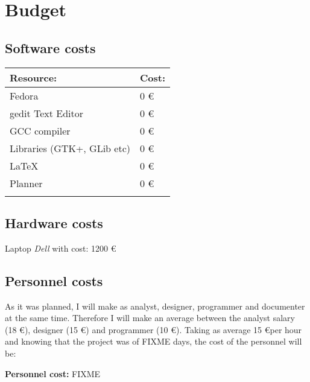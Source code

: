 
\chapter{Budget}


\section{Software costs}\label{sec:SoftwareCosts}

\begin{center}
  \begin{tabularx}{0.75\textwidth}{|X|X|}
    \firsthline
    \textbf{Resource:} & \textbf{Cost:} \\
    \hline
    Fedora & 0 \euro \\
    \hline
    gedit Text Editor & 0 \euro \\
    \hline
    GCC compiler & 0 \euro \\
    \hline
    Libraries (GTK+, GLib etc) & 0 \euro \\
    \hline
    \LaTeX & 0 \euro \\
    \hline
    Planner & 0 \euro \\
    \lasthline
  \end{tabularx}
\end{center}

\section{Hardware costs}\label{sec:HardwareCosts}

Laptop \emph{Dell} with cost: 1200 \euro

\section{Personnel costs}\label{sec:PersonnelCosts}

As it was planned, I will make as analyst, designer, programmer and documenter at the same time. Therefore I will make an average between the analyst salary (18 \euro), designer (15 \euro) and programmer (10 \euro). Taking as average 15 \euro per hour and knowing that the project was of FIXME days, the cost of the personnel will be:

\textbf{Personnel cost:} FIXME
